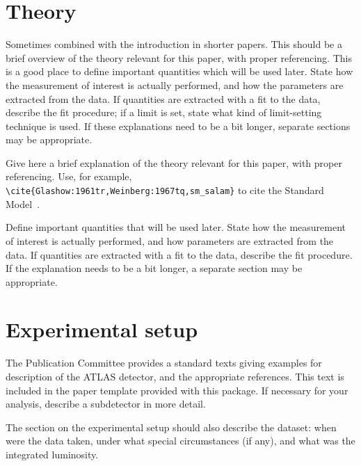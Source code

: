 \documentclass[UKenglish]{latex/atlasdoc}
\begin{document}
\section{Theory}
\label{sec:theory}

Sometimes combined with the introduction in shorter papers. 
This should be a brief overview of the theory relevant for this paper, with proper referencing.
This is a good place to define important quantities which will be used later.
State how the measurement of interest is actually performed, and how the parameters are extracted from the data.
If quantities are extracted with a fit to the data, describe the fit procedure;
if a limit is set, state what kind of limit-setting technique is used.
If these explanations need to be a bit longer, separate sections may be appropriate.

Give here a brief explanation of the theory relevant for this paper,
with proper referencing. Use, for example,
\verb|\cite{Glashow:1961tr,Weinberg:1967tq,sm_salam}| to cite the
Standard Model~\cite{Glashow:1961tr,Weinberg:1967tq,sm_salam}.

Define important quantities that will be used later.
State how the measurement of interest is actually performed, and how parameters are
extracted from the data.  
If quantities are extracted with a fit to the data, describe the fit procedure.
If the explanation needs to be a bit longer, a separate section may be appropriate.


\section{Experimental setup}
\label{sec:atlas}

The Publication Committee provides a standard texts giving examples
for description of the ATLAS detector, and the appropriate references.
This text is included in the paper template provided with this package.
If necessary for your analysis, describe a subdetector in more detail.

The section on the experimental setup should also describe the dataset:
when were the data taken, under what special circumstances (if any),
and what was the integrated luminosity.
\end{document}

